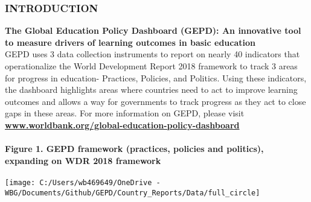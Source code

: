 \documentclass[twocolumn]{article}
\author{}
\date{\vspace{-2.5em}}
\let\oldparagraph\paragraph
\renewcommand{\paragraph}[1]{\oldparagraph{#1}\mbox{}}
\begin{document}
\newcommand{\greynote}[1]{
    {\scriptsize
    \textcolor{darkgray}{\textit{Source:} #1}
  }
}

\newcommand{\greysource}[1]{
    {\scriptsize
    \textcolor{darkgray}{\textit{Source:} #1}
  }
}

\newcommand{\greydisclaimer}[1]{
    {\scriptsize
    \textcolor{darkgray}{\textit{Disclaimer:} #1}
  }
}

\newcommand{\greytext}[1]{
    {\scriptsize
    \textcolor{darkgray}{#1}
  }
}

\newcommand*{\tabindent}{\hspace{1mm}}

\hypertarget{introduction}{%
\subsubsection{\texorpdfstring{\textbf{INTRODUCTION}}{INTRODUCTION}}\label{introduction}}

\textbf{The Global Education Policy Dashboard (GEPD): An innovative tool
to measure drivers of learning outcomes in basic education}\\
GEPD uses 3 data collection instruments to report on nearly 40
indicators that operationalize the World Development Report 2018
framework to track 3 areas for progress in education- Practices,
Policies, and Politics. Using these indicators, the dashboard highlights
areas where countries need to act to improve learning outcomes and
allows a way for governments to track progress as they act to close gaps
in these areas. For more information on GEPD, please visit
\textbf{\href{https://www.worldbank.org/en/topic/education/brief/global-education-policy-dashboard}{www.worldbank.org/global-education-policy-dashboard}}

\hypertarget{figure-1.-gepd-framework-practices-policies-and-politics-expanding-on-wdr-2018-framework}{%
\paragraph{Figure 1. GEPD framework (practices, policies and politics),
expanding on WDR 2018
framework}\label{figure-1.-gepd-framework-practices-policies-and-politics-expanding-on-wdr-2018-framework}}

\begin{center}\texttt{[image: C:/Users/wb469649/OneDrive - WBG/Documents/Github/GEPD/Country\_Reports/Data/full\_circle]} \end{center}
\end{document}
